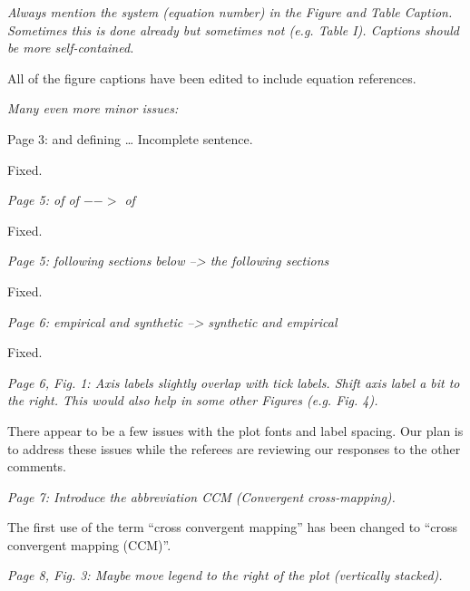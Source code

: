 \documentclass[a4paper,11pt]{article}
\begin{document}
\vspace{0.5cm}
{\em  Always mention the system (equation number) in the Figure and Table
Caption. Sometimes this is done already but sometimes not (e.g. Table
I). Captions should be more self-contained.}
\vspace{0.5cm}

All of the figure captions have been edited to include equation references.

\vspace{0.5cm}
{\em  Many even more minor issues:

Page 3: and defining … Incomplete sentence.}
\vspace{0.5cm}

Fixed.

\vspace{0.5cm}
{\em Page 5: of of $-->$ of}
\vspace{0.5cm}

Fixed.

\vspace{0.5cm}
{\em Page 5: following sections below --> the following sections}
\vspace{0.5cm}

Fixed.

\vspace{0.5cm}
{\em Page 6: empirical and synthetic --> synthetic and empirical}
\vspace{0.5cm}

Fixed.

\vspace{0.5cm}
{\em Page 6, Fig. 1: Axis labels slightly overlap with tick labels. Shift
axis label a bit to the right. This would also help in some other
Figures (e.g. Fig. 4).}
\vspace{0.5cm}

There appear to be a few issues with the plot fonts and label spacing.  Our plan is to address these issues while the referees are reviewing our responses to the other comments.

\vspace{0.5cm}
{\em Page 7: Introduce the abbreviation CCM (Convergent cross-mapping).}
\vspace{0.5cm}

The first use of the term ``cross convergent mapping'' has been changed to ``cross convergent mapping (CCM)''.

\vspace{0.5cm}
{\em Page 8, Fig. 3: Maybe move legend to the right of the plot (vertically
stacked).}
\vspace{0.5cm}
\end{document}
